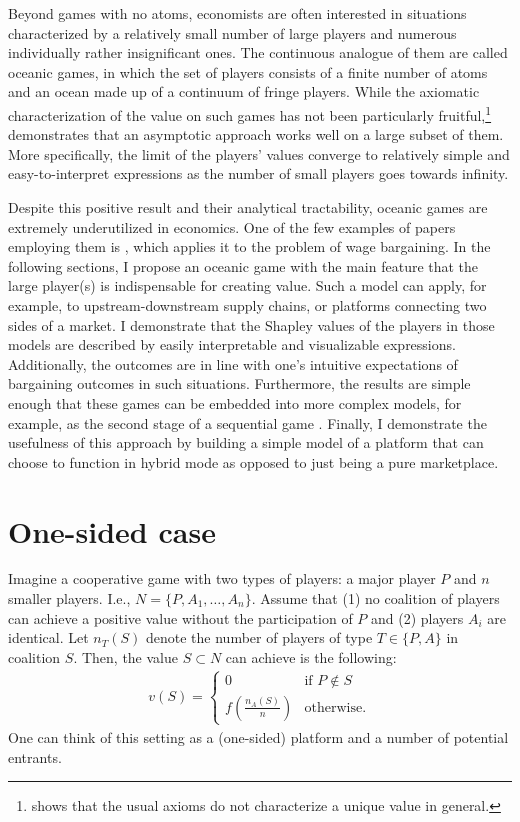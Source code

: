 \documentclass[a4paper]{article}
\begin{document}
Beyond games with no atoms, economists are often interested in situations characterized by a relatively small number of large players and numerous individually rather insignificant ones. The continuous analogue of them are called oceanic games, in which the set of players consists of a finite number of atoms and an ocean made up of a continuum of fringe players. While the axiomatic characterization of the value on such games has not been particularly fruitful,\footnote{\textcite{hart1973values} shows that the usual axioms do not characterize a unique value in general.} \textcite{fogelman1980asymptotic} demonstrates that an asymptotic approach works well on a large subset of them. More specifically, the limit of the players' values converge to relatively simple and easy-to-interpret expressions as the number of small players goes towards infinity.

Despite this positive result and their analytical tractability, oceanic games are extremely underutilized in economics. One of the few examples of papers employing them is \textcite{levy1997individual}, which applies it to the problem of wage bargaining. In the following sections, I propose an oceanic game with the main feature that the large player(s) is indispensable for creating value. Such a model can apply, for example, to upstream-downstream supply chains, or platforms connecting two sides of a market. I demonstrate that the Shapley values of the players in those models are described by easily interpretable and visualizable expressions. Additionally, the outcomes are in line with one's intuitive expectations of bargaining outcomes in such situations. Furthermore, the results are simple enough that these games can be embedded into more complex models, for example, as the second stage of a sequential game \parencite[as in e.g.][]{montez2007downstream}. Finally, I demonstrate the usefulness of this approach by building a simple model of a platform that can choose to function in hybrid mode as opposed to just being a pure marketplace.


\section{One-sided case}

Imagine a cooperative game with two types of players: a major player $P$ and $n$ smaller players. I.e., $N = \{P, A_1, \dots, A_n\}$. Assume that (1) no coalition of players can achieve a positive value without the participation of $P$ and (2) players $A_i$ are identical. Let $n_T(S)$ denote the number of players of type $T \in \{P, A\}$ in coalition $S$. Then, the value $S \subset N$ can achieve is the following:
\begin{align*}
    v(S) = \begin{cases}
        0                              & \text{if } P \notin S \\
        f\left(\frac{n_A(S)}{n}\right) & \text{otherwise}.
    \end{cases}
\end{align*}
One can think of this setting as a (one-sided) platform and a number of potential entrants.
\end{document}
